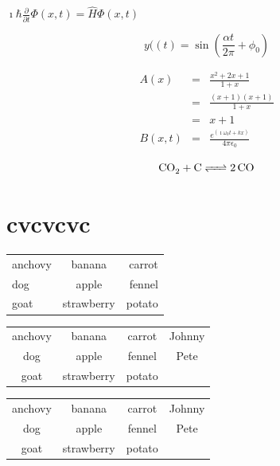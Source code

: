 \documentclass{NEWSTYLE}
\begin{document}
\begin{center}
	
\begin{math}
\imath\hbar\frac{\partial}{\partial t}\Phi\left( x,t \right) =
\hat{H}\Phi \left( x,t \right)
\end{math}


\begin{equation}
y(\left(t\right)= \sin \left(\frac{{\alpha}t}{2\pi} + \phi_0\right)
\end{equation}

\begin{eqnarray}
A\left( x\right) & = & \frac{x^2+2x+1}{1+x} \\
& = & \frac{\left(x+1\right)\left(x+1\right)}{1+x} \nonumber\\
& = & x+1 \nonumber\\
B(x,t) & = & \frac{e^{\left(\imath\omega_0 t + kx\right)}}{4\pi\epsilon_0}
\end{eqnarray}






\begin{equation}
\ce{CO2 + C <=> 2CO}
\end{equation}

\chapter{cvcvcvc}

\begin{tabular}{lcr}
	anchovy & banana & carrot \\
	dog & apple & fennel \\
	goat & strawberry & potato
\end{tabular}

\begin{tabular}{cccc}
	anchovy & banana & carrot & Johnny\\
	dog & apple & fennel & Pete\\
	goat & strawberry & potato &
\end{tabular}

\begin{tabular}{|c|c|c|c|}
	anchovy & banana & carrot & Johnny\\
	dog & apple & fennel & Pete\\
	goat & strawberry & potato &
\end{tabular}


\end{center}
\end{document}
